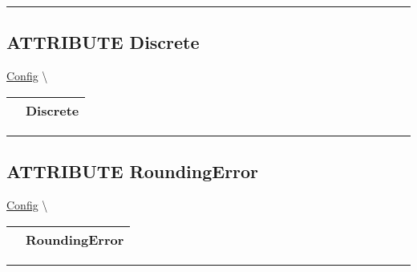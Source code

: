 \par


\rule{\linewidth}{0.5pt}
\subsection*{\textsf{\colorbox{headtoc}{\color{white} ATTRIBUTE}
Discrete}}

\hypertarget{ecldoc:ml_core.config.discrete}{}
\hspace{0pt} \hyperlink{ecldoc:ML_Core.Config}{Config} \textbackslash 

{\renewcommand{\arraystretch}{1.5}
\begin{tabularx}{\textwidth}{|>{\raggedright\arraybackslash}l|X|}
\hline
\hspace{0pt}\mytexttt{\color{red} } & \textbf{Discrete} \\
\hline
\end{tabularx}
}

\par


\rule{\linewidth}{0.5pt}
\subsection*{\textsf{\colorbox{headtoc}{\color{white} ATTRIBUTE}
RoundingError}}

\hypertarget{ecldoc:ml_core.config.roundingerror}{}
\hspace{0pt} \hyperlink{ecldoc:ML_Core.Config}{Config} \textbackslash 

{\renewcommand{\arraystretch}{1.5}
\begin{tabularx}{\textwidth}{|>{\raggedright\arraybackslash}l|X|}
\hline
\hspace{0pt}\mytexttt{\color{red} } & \textbf{RoundingError} \\
\hline
\end{tabularx}
}

\par


\rule{\linewidth}{0.5pt}



